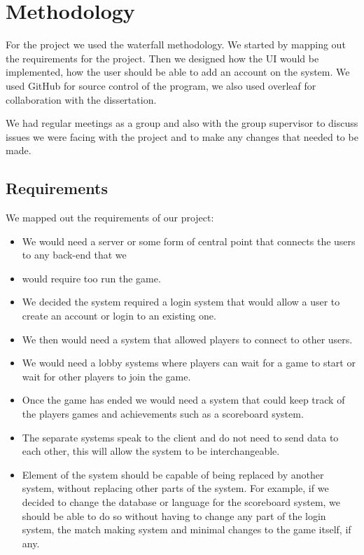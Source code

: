 
\chapter{Methodology}

For the project we used the waterfall methodology. We started by mapping out the requirements for the project. Then we designed how the UI would be implemented, how the user should be able to add an account on the system.  We used GitHub for source control of the program, we also used overleaf for collaboration with the dissertation.

We had regular meetings as a group and also with the group supervisor to discuss issues we were facing with the project and to make any changes that needed to be made.

\section{Requirements}

We mapped out the requirements of our project:
\begin{itemize}
\item We would need a server or some form of central point that connects the users to any back-end that we \item would require too run the game.
\item We decided the system required a login system that would allow a user to create an account or login to an existing one.
\item We then would need a system that allowed players to connect to other users.
\item We would need a lobby systems where players can wait for a game to start or wait for other players to join the game.
\item Once the game has ended we would need a system that could keep track of the players games and achievements such as a scoreboard system.
\item The separate systems speak to the client and do not need to send data to each other, this will allow the system to be interchangeable.
\item Element of the system should be capable of being replaced by another system, without replacing other parts of the system. For example, if we decided to change the database or language for the scoreboard system, we should be able to do so without having to change any part of the login system, the match making system and minimal changes to the game itself, if any.
\end{itemize}


